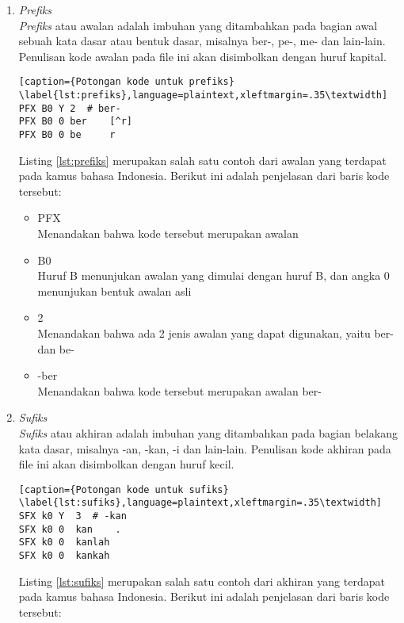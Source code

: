 \begin{enumerate}
	\item \textit{Prefiks} \\
	\textit{Prefiks} atau awalan adalah imbuhan yang ditambahkan pada bagian awal sebuah kata dasar atau bentuk dasar, misalnya ber-, pe-, me- dan lain-lain. Penulisan kode awalan pada file ini akan disimbolkan dengan huruf kapital.
	
	\begin{lstlisting}[caption={Potongan kode untuk prefiks}			\label{lst:prefiks},language=plaintext,xleftmargin=.35\textwidth] 
PFX B0 Y 2	# ber-
PFX B0 0 ber  	[^r]
PFX B0 0 be    	r
	\end{lstlisting}
	
	Listing \ref{lst:prefiks} merupakan salah satu contoh dari awalan yang terdapat pada kamus bahasa Indonesia. Berikut ini adalah penjelasan dari baris kode tersebut:	

	\begin{itemize}
		\item PFX\\
		Menandakan bahwa kode tersebut merupakan awalan
		
		\item B0\\
		Huruf B menunjukan awalan yang dimulai dengan huruf B, dan angka 0 menunjukan bentuk awalan asli
		
		\item 2\\
		Menandakan bahwa ada 2 jenis awalan yang dapat digunakan, yaitu ber- dan be-
		\item -ber\\
		Menandakan bahwa kode tersebut merupakan awalan ber-
	\end{itemize}	
		
	\item \textit{Sufiks} \\	
	\textit{Sufiks} atau akhiran adalah imbuhan yang ditambahkan pada bagian belakang kata dasar, misalnya -an, -kan, -i dan lain-lain. Penulisan kode akhiran pada file ini akan disimbolkan dengan huruf kecil.
	
	\begin{lstlisting}[caption={Potongan kode untuk sufiks}			\label{lst:sufiks},language=plaintext,xleftmargin=.35\textwidth] 
SFX k0 Y  3	 # -kan
SFX k0 0  kan    . 
SFX k0 0  kanlah
SFX k0 0  kankah
	\end{lstlisting}
	
	 Listing \ref{lst:sufiks} merupakan salah satu contoh dari akhiran yang terdapat pada kamus bahasa Indonesia. Berikut ini adalah penjelasan dari baris kode tersebut:
	

\end{enumerate}
